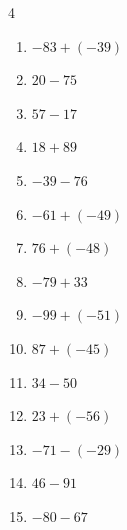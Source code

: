 \begin{multicols}{4}
\begin{enumerate}
        \phantom{$=105$}

  \item $-83+(-39)$

        \phantom{$=-122$}

  \item $20-75$

        \phantom{$=-55$}

  \item $57-17$

        \phantom{$=40$}

  \item $18+89$

        \phantom{$=107$}

  \item $-39-76$

        \phantom{$=-115$}

\columnbreak %

\resetques

  \item $-61+(-49)$

        \phantom{$=-110$}

  \item $76+(-48)$

        \phantom{$=28$}

  \item $-79+33$

        \phantom{$=-46$}

  \item $-99+(-51)$

        \phantom{$=-150$}

  \item $87+(-45)$

        \phantom{$=42$}

  \item $34-50$

        \phantom{$=-16$}

  \item $23+(-56)$

        \phantom{$=-33$}

  \item $-71-(-29)$

        \phantom{$=-42$}

  \item $46-91$

        \phantom{$=-45$}

  \item $-80-67$

        \phantom{$=-147$}


\end{enumerate}
\end{multicols}
